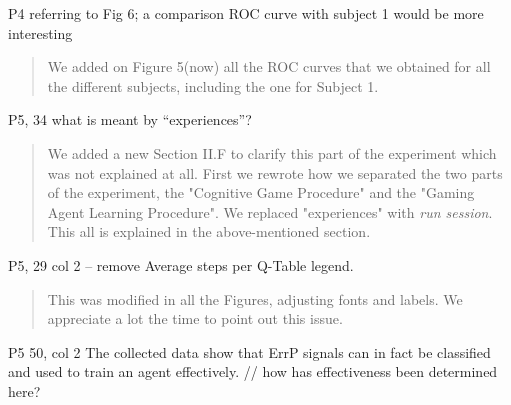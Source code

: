 \documentclass[journal,onecolumn,12pt]{IEEEtran}
\begin{document}
P4 referring to Fig 6; a comparison ROC curve with subject 1 would be more interesting

\vspace{2em}
\begin{quotation}
{\color{blue}
We added on Figure 5(now) all the ROC curves that we obtained for all the different subjects, including the one for Subject 1.  
}
\end{quotation}
\vspace{2em}


P5, 34 what is meant by “experiences”?

\vspace{2em}
\begin{quotation}
{\color{blue}
We added a new Section II.F to clarify this part of the experiment which was not explained at all.  First we rewrote how we separated the two parts of the experiment, the "Cognitive Game Procedure" and the "Gaming Agent Learning Procedure".   We replaced "experiences" with \textit{run session}.  This all is explained in the above-mentioned section.
}
\end{quotation}
\vspace{2em}

P5, 29 col 2 – remove Average steps per Q-Table legend.

\vspace{2em}
\begin{quotation}
{\color{blue}
This was modified in all the Figures, adjusting fonts and labels.  We appreciate a lot the time to point out this issue.
}
\end{quotation}
\vspace{2em}

P5 50, col 2 The collected data show that ErrP signals can in fact be classified and used to train an agent effectively.
// how has effectiveness been determined here?
\end{document}
